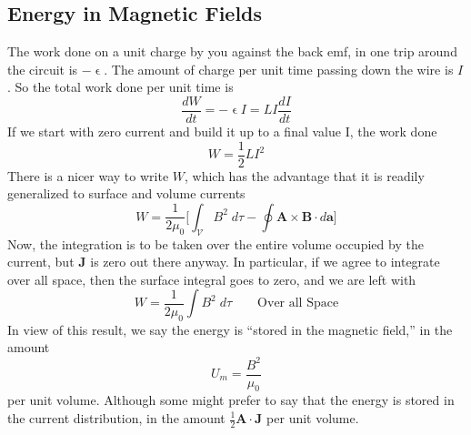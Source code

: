 \documentclass[../../../main.tex]{subfiles}
\begin{document}
\subsection*{Energy in Magnetic Fields}
The work done on a unit charge by you against the back emf, in one trip around the circuit is $-\upvarepsilon$. The amount of charge per unit time passing down the wire is $I $. So the total work done per unit time is
\begin{equation*}
    \frac{dW}{dt}=-\upvarepsilon I=LI\frac{dI}{dt}
\end{equation*}
If we start with zero current and build it up to a ﬁnal value I, the work done
\begin{equation*}
    W=\frac{1}{2}LI^2
\end{equation*}
There is a nicer way to write $W$, which has the advantage that it is readily generalized to surface and volume currents
\begin{equation*}
    W=\frac{1}{2\mu_0}\bigg[\int_\mathcal{V} B^2\;d\tau-\oint \mathbf{A}\times \mathbf{B}\cdot d\mathbf{a}\bigg]
\end{equation*}
Now, the integration is to be taken over the entire volume occupied by the current, but \textbf{J} is zero out there anyway. In particular, if we agree to integrate over all space, then the surface integral goes to zero, and we are left with
\begin{equation*}
    W=\frac{1}{2\mu_0}\int B^2 \;d\tau\qquad\text{Over all Space}
\end{equation*}
In view of this result, we say the energy is “stored in the magnetic ﬁeld,” in the amount
\begin{equation*}
    U_m=\frac{B^2}{\mu_0}
\end{equation*}
per unit volume. Although some might prefer to say that the energy is stored in the current distribution, in the amount $\frac{1}{2}\mathbf{A}\cdot\mathbf{J}$ per unit volume.
\end{document}
